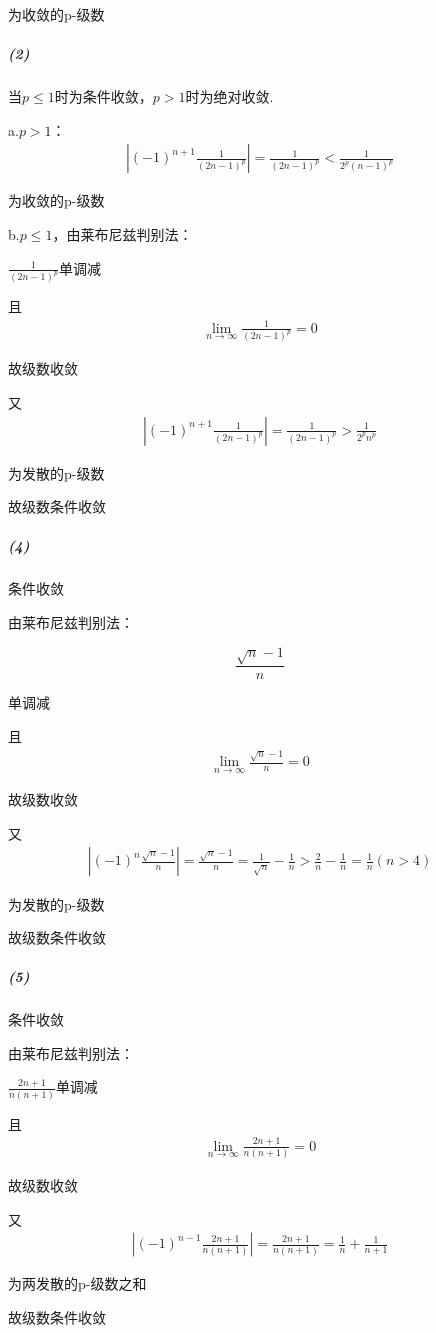 \documentclass[UTF8]{ctexart}
\begin{document}
    为收敛的p-级数

    \subparagraph*{(2)}
    当$p \le 1$时为条件收敛，$p>1$时为绝对收敛.
    
    a.$p > 1$：
    \begin{align*}
        \left|(-1)^{n+1}\frac{1}{(2n-1)^p}\right| = \frac{1}{(2n-1)^p}  < \frac{1}{2^p (n-1)^p} 
    \end{align*}
    
    为收敛的p-级数

    b.$p \le 1$，由莱布尼兹判别法：

    $\frac{1}{(2n-1)^p}$单调减
    
    且
    \begin{align*}
        \lim \limits_{n \to \infty} \frac{1}{(2n-1)^p} = 0
    \end{align*}

    故级数收敛
    
    又
    \begin{align*}
        \left|(-1)^{n+1}\frac{1}{(2n-1)^p}\right| = \frac{1}{(2n-1)^p}  > \frac{1}{2^p n^p} 
    \end{align*}

    为发散的p-级数

    故级数条件收敛

    \subparagraph*{(4)}
    条件收敛

    由莱布尼兹判别法：

    $$\frac{\sqrt{n}-1}{n}$$
    
    单调减
    
    且
    \begin{align*}
        \lim \limits_{n \to \infty} \frac{\sqrt{n}-1}{n} = 0
    \end{align*}

    故级数收敛
    
    又
    \begin{align*}
        \left|(-1)^{n}\frac{\sqrt{n}-1}{n}\right| = \frac{\sqrt{n}-1}{n} =\frac{1}{\sqrt{n}} - \frac{1}{n}  > 
        \frac{2}{n} - \frac{1}{n} = \frac{1}{n} (n>4)
    \end{align*}

    为发散的p-级数

    故级数条件收敛

    \subparagraph*{(5)}
    条件收敛

    由莱布尼兹判别法：

    $\frac{2n+1}{n(n+1)}$单调减
    
    且
    \begin{align*}
        \lim \limits_{n \to \infty} \frac{2n+1}{n(n+1)} = 0
    \end{align*}

    故级数收敛
    
    又
    \begin{align*}
        \left|(-1)^{n-1}\frac{2n+1}{n(n+1)}\right| = \frac{2n+1}{n(n+1)} = \frac{1}{n} + \frac{1}{n+1}
    \end{align*}

    为两发散的p-级数之和

    故级数条件收敛
\end{document}
